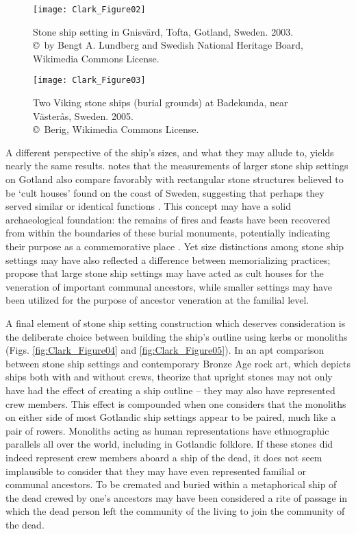 \begin{figure}[!htb]
	\texttt{[image: Clark\_Figure02]}
	\caption{Stone ship setting in Gnisvärd, Tofta, Gotland, Sweden. 2003.
		{\normalfont\scriptsize \\ \copyright\ by Bengt A. Lundberg and Swedish National Heritage Board, Wikimedia Commons License.
	}}
	\label{fig:Clark_Figure02}
\end{figure}

\begin{figure}[!htb]
	\texttt{[image: Clark\_Figure03]}
	\caption{Two Viking stone ships (burial grounds) at Badekunda, near Västerås, Sweden. 2005.
		{\normalfont\scriptsize \\ \copyright\ Berig, Wikimedia Commons License.
	}}
	\label{fig:Clark_Figure03}
\end{figure}


A different perspective of the ship’s sizes, and what they may allude to, yields nearly the same results. \textcite{Bradley_2010} notes that the measurements of larger stone ship settings on Gotland also compare favorably with rectangular stone structures believed to be ‘cult houses’ found on the coast of Sweden,
suggesting that perhaps they served similar or identical functions \parencite[97]{Bradley_2010}.
This concept may have a solid archaeological foundation: the remains of fires and feasts have been recovered from within the boundaries of these burial monuments, potentially indicating their purpose as a commemorative place \parencite[261]{Price_2008}.
Yet size distinctions among stone ship settings may have also reflected a difference between memorializing practices; \textcite[97]{Bradley_2010} propose that large stone ship settings may have acted as cult houses for the veneration of important communal ancestors, while smaller settings may have been utilized for the purpose of ancestor veneration at the familial level.

A final element of stone ship setting construction which deserves consideration is the deliberate choice between building the ship’s outline using kerbs or monoliths (Figs. \ref{fig:Clark_Figure04} and \ref{fig:Clark_Figure05}).
In an apt comparison between stone ship settings and contemporary Bronze Age rock art, which depicts ships both with and without crews, \textcite[86--87]{Bradley_2010} theorize that upright stones may not only have had the effect of creating a ship outline – they may also have represented crew members. This effect is compounded when one considers that the monoliths on either side of most Gotlandic ship settings appear to be paired, much like a pair of rowers. Monoliths acting as human representations have ethnographic parallels all over the world, including in Gotlandic folklore. If these stones did indeed represent crew members aboard a ship of the dead, it does not seem implausible to consider that they may have even represented familial or communal ancestors. To be cremated and buried within a metaphorical ship of the dead crewed by one’s ancestors may have been considered a rite of passage in which the dead person left the community of the living to join the community of the dead.

